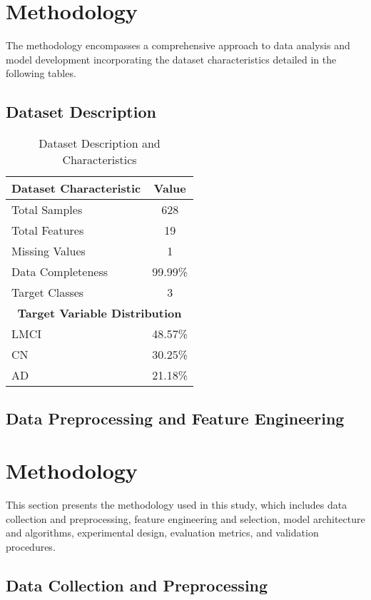 \documentclass[conference]{IEEEtran}
\begin{document}
\section{Methodology}
The methodology encompasses a comprehensive approach to data analysis and model development incorporating the dataset characteristics detailed in the following tables.

\subsection{Dataset Description}

\begin{table}[!h]
\centering
\caption{Dataset Description and Characteristics}
\label{tab:dataset_description}
\begin{tabular}{|l|c|}
\hline
\textbf{Dataset Characteristic} & \textbf{Value} \\
\hline
Total Samples & 628 \\
\hline
Total Features & 19 \\
\hline
Missing Values & 1 \\
\hline
Data Completeness & 99.99\% \\
\hline
Target Classes & 3 \\
\hline
\hline
\multicolumn{2}{|c|}{\textbf{Target Variable Distribution}} \\
\hline
LMCI & 48.57\% \\
\hline
CN & 30.25\% \\
\hline
AD & 21.18\% \\
\hline
\end{tabular}
\end{table}



\subsection{Data Preprocessing and Feature Engineering}
\section{Methodology}

This section presents the methodology used in this study, which includes data collection and preprocessing, feature engineering and selection, model architecture and algorithms, experimental design, evaluation metrics, and validation procedures.

\subsection{Data Collection and Preprocessing}
\end{document}
